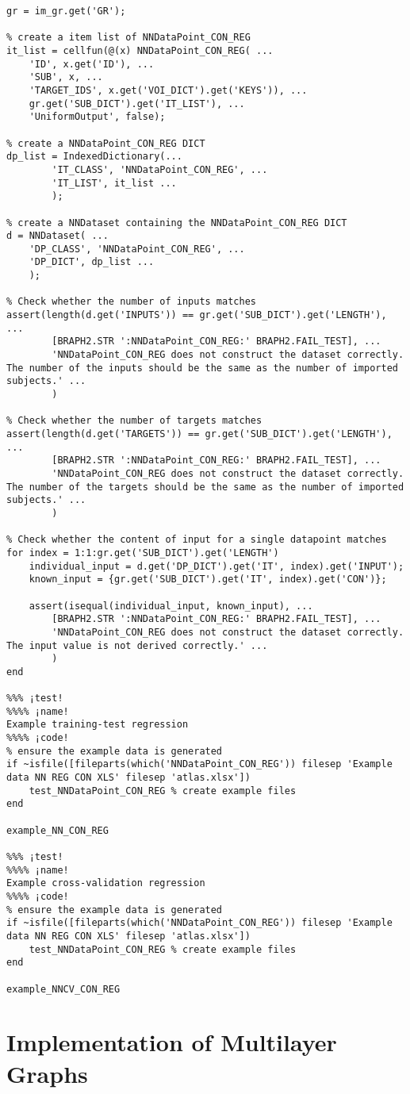 \documentclass{tufte-handout}
\begin{document}
\begin{lstlisting}
gr = im_gr.get('GR');

% create a item list of NNDataPoint_CON_REG
it_list = cellfun(@(x) NNDataPoint_CON_REG( ...
    'ID', x.get('ID'), ...
    'SUB', x, ...
    'TARGET_IDS', x.get('VOI_DICT').get('KEYS')), ...
    gr.get('SUB_DICT').get('IT_LIST'), ...
    'UniformOutput', false);

% create a NNDataPoint_CON_REG DICT
dp_list = IndexedDictionary(...
        'IT_CLASS', 'NNDataPoint_CON_REG', ...
        'IT_LIST', it_list ...
        );

% create a NNDataset containing the NNDataPoint_CON_REG DICT
d = NNDataset( ...
    'DP_CLASS', 'NNDataPoint_CON_REG', ...
    'DP_DICT', dp_list ...
    );

% Check whether the number of inputs matches
assert(length(d.get('INPUTS')) == gr.get('SUB_DICT').get('LENGTH'), ...
		[BRAPH2.STR ':NNDataPoint_CON_REG:' BRAPH2.FAIL_TEST], ...
		'NNDataPoint_CON_REG does not construct the dataset correctly. The number of the inputs should be the same as the number of imported subjects.' ...
		)

% Check whether the number of targets matches
assert(length(d.get('TARGETS')) == gr.get('SUB_DICT').get('LENGTH'), ...
		[BRAPH2.STR ':NNDataPoint_CON_REG:' BRAPH2.FAIL_TEST], ...
		'NNDataPoint_CON_REG does not construct the dataset correctly. The number of the targets should be the same as the number of imported subjects.' ...
		)

% Check whether the content of input for a single datapoint matches
for index = 1:1:gr.get('SUB_DICT').get('LENGTH')
    individual_input = d.get('DP_DICT').get('IT', index).get('INPUT');
    known_input = {gr.get('SUB_DICT').get('IT', index).get('CON')};

    assert(isequal(individual_input, known_input), ...
        [BRAPH2.STR ':NNDataPoint_CON_REG:' BRAPH2.FAIL_TEST], ...
        'NNDataPoint_CON_REG does not construct the dataset correctly. The input value is not derived correctly.' ...
        )
end

%%% ¡test! 
%%%% ¡name!
Example training-test regression
%%%% ¡code!
% ensure the example data is generated
if ~isfile([fileparts(which('NNDataPoint_CON_REG')) filesep 'Example data NN REG CON XLS' filesep 'atlas.xlsx'])
    test_NNDataPoint_CON_REG % create example files
end

example_NN_CON_REG

%%% ¡test! 
%%%% ¡name!
Example cross-validation regression
%%%% ¡code!
% ensure the example data is generated
if ~isfile([fileparts(which('NNDataPoint_CON_REG')) filesep 'Example data NN REG CON XLS' filesep 'atlas.xlsx'])
    test_NNDataPoint_CON_REG % create example files
end

example_NNCV_CON_REG

\end{lstlisting}

\clearpage
\section{Implementation of Multilayer Graphs}


%
%
\end{document}
